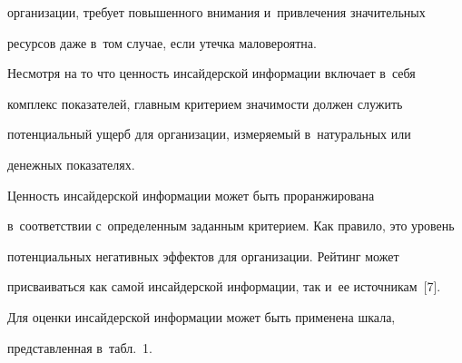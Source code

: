 организации, требует повышенного внимания и~привлечения значительных 


ресурсов даже в~том случае, если утечка маловероятна.


     


     Несмотря на то что ценность инсайдерской информации включает в~себя 


комплекс показателей, главным критерием значимости должен служить 


потенциальный ущерб для организации, измеряемый в~натуральных или 


денежных показателях.


     


     Ценность инсайдерской информации может быть проранжирована 


в~соответствии с~определенным заданным критерием. Как правило, это уровень 


потенциальных негативных эффектов для организации. Рейтинг может 


присваиваться как самой инсайдерской информации, так и~ее источникам~[7]. 


Для оценки инсайдерской информации может быть применена шкала, 


представленная в~табл.~1.


     



